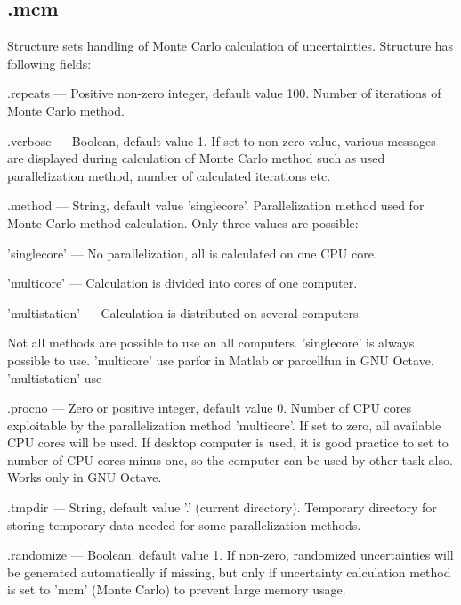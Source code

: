 \documentclass[12pt,a4paper,oneside]{report} %
\def\octave{{\sc GNU Octave}\xspace}
\begin{document}
\subsection{\textsf{.mcm}} %
Structure sets handling of Monte Carlo calculation of uncertainties. Structure has following fields:
\begin{tightdesc}
        \item [\textsf{.repeats}] ---  Positive non-zero integer, default value 100. Number of iterations of Monte Carlo method.

        \item [\textsf{.verbose}] ---  Boolean, default value 1. If set to non-zero value, various messages
        are displayed during calculation of Monte Carlo method such as used parallelization method,
        number of calculated iterations etc.

        \item [\textsf{.method}] ---  String, default value 'singlecore'. Parallelization method used for Monte
        Carlo method calculation. Only three values are possible:
        \begin{tightdesc}
                \item [\textsf{'singlecore'}] ---  No parallelization, all is calculated on one CPU core.
                \item [\textsf{'multicore'}] ---  Calculation is divided into cores of one computer.
                \item [\textsf{'multistation'}] ---  Calculation is distributed on several computers.
        \end{tightdesc}
        Not all methods are possible to use on all computers. 'singlecore' is always possible to
        use. 'multicore' use parfor in Matlab or parcellfun in GNU Octave. 'multistation' use %

        \item [\textsf{.procno}] ---  Zero or positive integer, default value 0. Number of CPU cores exploitable
        by the parallelization method \textsf{'multicore'}. If set to zero, all available CPU cores will be used. If
        desktop computer is used, it is good practice to set to number of CPU cores minus one, so
        the computer can be used by other task also. 
        Works only in \octave.

        \item [\textsf{.tmpdir}] ---  String, default value '.' (current directory). Temporary directory for
        storing temporary data needed for some parallelization methods. %

        \item [\textsf{.randomize}] ---  Boolean, default value 1. If non-zero, randomized uncertainties will be
        generated automatically if missing, but only if uncertainty calculation method is set to
        'mcm' (Monte Carlo) to prevent large memory usage.
\end{tightdesc}
\end{document}
